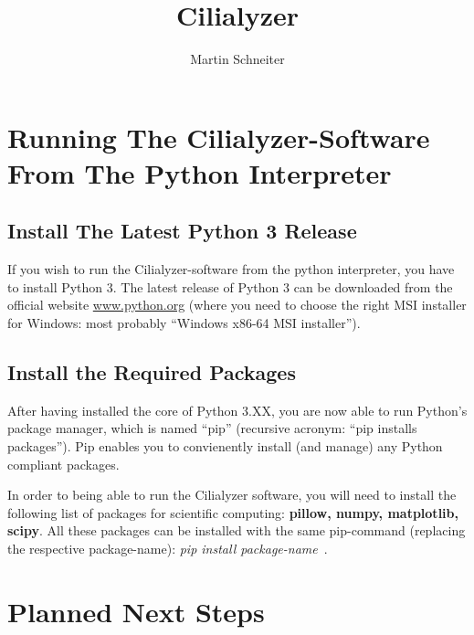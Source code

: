\documentclass{article}
\begin{document}
\title{Cilialyzer}
\author{Martin Schneiter}

\maketitle

\section{Running The Cilialyzer-Software From The Python Interpreter}
\subsection{Install The Latest Python 3 Release}
If you wish to run the Cilialyzer-software from the python interpreter, 
you have to install Python 3. 
The latest release of Python 3 can be downloaded from the 
official website \url{www.python.org}
(where you need to choose the right MSI installer for Windows: 
most probably ``Windows x86-64 MSI installer''). 
\subsection{Install the Required Packages}
After having installed the core of Python 3.XX, you are now able to 
run Python's package manager, which is named ``pip''
(recursive acronym: ``pip installs packages''). 
Pip enables you to convienently install (and manage) any Python compliant 
packages.\par
In order to being able to run the Cilialyzer software, 
you will need to install the following list of packages for scientific 
computing: \textbf{pillow, numpy, matplotlib, scipy}. 
All these packages can be installed with the same pip-command 
(replacing the respective package-name): 
\textit{pip install package-name}~.


\section{Planned Next Steps}
\end{document}
